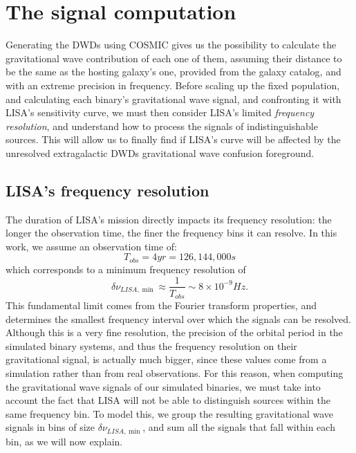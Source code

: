 \section{The signal computation}
Generating the DWDs using COSMIC gives us the possibility to calculate the gravitational wave contribution of each one of them, assuming their distance to be the same as the hosting galaxy's one, provided from the galaxy catalog, and with an extreme precision in frequency.
Before scaling up the fixed population, and calculating each binary's gravitational wave signal, and confronting it with LISA's sensitivity curve, we must then consider LISA's limited \textit{frequency resolution}, and understand how to process the signals of indistinguishable sources.
This will allow us to finally find if LISA's curve will be affected by the unresolved extragalactic DWDs gravitational wave confusion foreground.

\subsection{LISA's frequency resolution}
The duration of LISA’s mission directly impacts its frequency resolution: the longer the observation time, the finer the frequency bins it can resolve.
In this work, we assume an observation time of: 
\[
    T_{obs}=4yr=126,144,000s
\]
which corresponds to a minimum frequency resolution of
\begin{equation}
    \delta\nu_{LISA,\min}\approx \frac{1}{T_{obs}}\sim 8\times 10^{-9}Hz.
    \label{eq: LISA frequency resolution}
\end{equation}
This fundamental limit comes from the Fourier transform properties, and determines the smallest frequency interval over which the signals can be resolved.
Although this is a very fine resolution, the precision of the orbital period in the simulated binary systems, and thus the frequency resolution on their gravitational signal, is actually much bigger, since these values come from a simulation rather than from real observations.
For this reason, when computing the gravitational wave signals of our simulated binaries, we must take into account the fact that LISA will not be able to distinguish sources within the same frequency bin.
To model this, we group the resulting gravitational wave signals in bins of size $\delta\nu_{LISA,\min}$, and sum all the signals that fall within each bin, as we will now explain.

